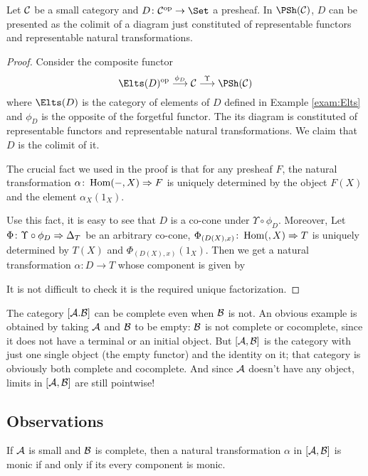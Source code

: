   \begin{thm}
    Let ${\cal C}$ be a small category and $D\colon\Cc^{\op}\to\Set$ a presheaf. In $\PSh(\Cc)$, $D$ can be presented as the colimit of a diagram just constituted of representable functors and representable natural transformations.
  \end{thm}
  \begin{proof}
    Consider the composite functor
    \begin{equation*}
      \Elts(D)^{\op}\markar{\phi_D}\Cc\markar{\Upsilon}\PSh(\Cc)
    \end{equation*}
    where $\Elts(D)$ is the category of elements of $D$ defined in Example \ref{exam:Elts} and $\phi_D$ is the opposite of the forgetful functor.
    The its diagram is constituted of representable functors and representable natural transformations. We claim that $D$ is the colimit of it.

    The crucial fact we used in the proof is that for any presheaf $F$, the natural transformation $\alpha\colon\operatorname{Hom}(-,X)\Rightarrow F$ is uniquely determined by the object $F(X)$ and the element $\alpha_X(1_X)$.

    Use this fact, it is easy to see that $D$ is a co-cone under $\Upsilon\circ\phi_D$. Moreover, Let $\Phi\colon\Upsilon\circ\phi_D \Rightarrow \Delta_T$ be an arbitrary co-cone, $\Phi_{(D(X),x)}\colon\operatorname{Hom}(,X)\Rightarrow T$ is uniquely determined by $T(X)$ and $\Phi_{(D(X),x)}(1_X)$. Then we get a natural transformation $\alpha\colon D\to T$ whose component is given by

    It is not difficult to check it is the required unique factorization.
  \end{proof}

  \begin{exam}
    The category $[{\cal A}.{\cal B}]$ can be complete even when ${\cal B}$ is not. An obvious example is obtained by taking ${\cal A}$ and ${\cal B}$ to be empty: ${\cal B}$ is not complete or cocomplete, since it does not have a terminal or an initial object. But $[{\cal A},{\cal B}]$ is the category with just one single object (the empty functor) and the identity on it; that category is obviously both complete and cocomplete. And since ${\cal A}$ doesn't have any object, limits in $[{\cal A},{\cal B}]$ are still pointwise! %
  \end{exam}

\subsection{Observations}
  \begin{ex}
    If ${\cal A}$ is small and ${\cal B}$ is complete, then a natural transformation $\alpha$ in $[{\cal A},{\cal B}]$ is monic if and only if its every component is monic.
  \end{ex}


